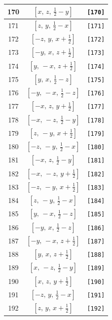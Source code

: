 \documentclass[fleqn,8pt]{jsarticle}
\begin{document}
\begin{longtable}{ccc}
170 & $\left[ x,\, z,\, \frac{1}{2} - y \right]$ & {\tt [170]} \\ \hline
171 & $\left[ z,\, y,\, \frac{1}{2} - x \right]$ & {\tt [171]} \\ \hline
172 & $\left[ - z,\, y,\, x + \frac{1}{2} \right]$ & {\tt [172]} \\ \hline
173 & $\left[ - y,\, x,\, z + \frac{1}{2} \right]$ & {\tt [173]} \\ \hline
174 & $\left[ y,\, - x,\, z + \frac{1}{2} \right]$ & {\tt [174]} \\ \hline
175 & $\left[ y,\, x,\, \frac{1}{2} - z \right]$ & {\tt [175]} \\ \hline
176 & $\left[ - y,\, - x,\, \frac{1}{2} - z \right]$ & {\tt [176]} \\ \hline
177 & $\left[ - x,\, z,\, y + \frac{1}{2} \right]$ & {\tt [177]} \\ \hline
178 & $\left[ - x,\, - z,\, \frac{1}{2} - y \right]$ & {\tt [178]} \\ \hline
179 & $\left[ z,\, - y,\, x + \frac{1}{2} \right]$ & {\tt [179]} \\ \hline
180 & $\left[ - z,\, - y,\, \frac{1}{2} - x \right]$ & {\tt [180]} \\ \hline
181 & $\left[ - x,\, z,\, \frac{1}{2} - y \right]$ & {\tt [181]} \\ \hline
182 & $\left[ - x,\, - z,\, y + \frac{1}{2} \right]$ & {\tt [182]} \\ \hline
183 & $\left[ - z,\, - y,\, x + \frac{1}{2} \right]$ & {\tt [183]} \\ \hline
184 & $\left[ z,\, - y,\, \frac{1}{2} - x \right]$ & {\tt [184]} \\ \hline
185 & $\left[ y,\, - x,\, \frac{1}{2} - z \right]$ & {\tt [185]} \\ \hline
186 & $\left[ - y,\, x,\, \frac{1}{2} - z \right]$ & {\tt [186]} \\ \hline
187 & $\left[ - y,\, - x,\, z + \frac{1}{2} \right]$ & {\tt [187]} \\ \hline
188 & $\left[ y,\, x,\, z + \frac{1}{2} \right]$ & {\tt [188]} \\ \hline
189 & $\left[ x,\, - z,\, \frac{1}{2} - y \right]$ & {\tt [189]} \\ \hline
190 & $\left[ x,\, z,\, y + \frac{1}{2} \right]$ & {\tt [190]} \\ \hline
191 & $\left[ - z,\, y,\, \frac{1}{2} - x \right]$ & {\tt [191]} \\ \hline
192 & $\left[ z,\, y,\, x + \frac{1}{2} \right]$ & {\tt [192]} \\
\end{longtable}
\end{document}
